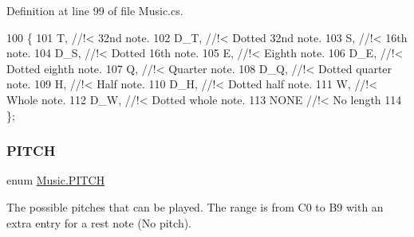 Definition at line 99 of file Music.\+cs.


\begin{DoxyCode}
100     \{
101         T, \textcolor{comment}{//!< 32nd note.}
102 \textcolor{comment}{}        D\_T, \textcolor{comment}{//!< Dotted 32nd note.}
103 \textcolor{comment}{}        S, \textcolor{comment}{//!< 16th note.}
104 \textcolor{comment}{}        D\_S, \textcolor{comment}{//!< Dotted 16th note.}
105 \textcolor{comment}{}        E, \textcolor{comment}{//!< Eighth note.}
106 \textcolor{comment}{}        D\_E, \textcolor{comment}{//!< Dotted eighth note.}
107 \textcolor{comment}{}        Q, \textcolor{comment}{//!< Quarter note.}
108 \textcolor{comment}{}        D\_Q, \textcolor{comment}{//!< Dotted quarter note.}
109 \textcolor{comment}{}        H, \textcolor{comment}{//!< Half note.}
110 \textcolor{comment}{}        D\_H, \textcolor{comment}{//!< Dotted half note.}
111 \textcolor{comment}{}        W, \textcolor{comment}{//!< Whole note.}
112 \textcolor{comment}{}        D\_W, \textcolor{comment}{//!< Dotted whole note.}
113 \textcolor{comment}{}        NONE \textcolor{comment}{//!< No length }
114 \textcolor{comment}{}    \};
\end{DoxyCode}
\mbox{\label{group___music_enums_ga508f69b199ea518f935486c990edac1d}} 
\subsubsection{\texorpdfstring{P\+I\+T\+CH}{PITCH}}
{\footnotesize\ttfamily enum \hyperlink{group___music_enums_ga508f69b199ea518f935486c990edac1d}{Music.\+P\+I\+T\+CH}\hspace{0.3cm}{\ttfamily [strong]}}



The possible pitches that can be played. The range is from C0 to B9 with an extra entry for a rest note (No pitch). 

